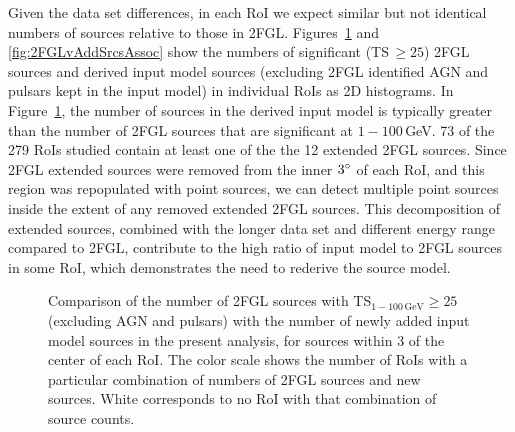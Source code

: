 {Given the data set differences, in each RoI we expect similar but not identical numbers of sources relative to those in 2FGL.
Figures~\ref{fig:2FGLvAddSrcs} and \ref{fig:2FGLvAddSrcsAssoc} show the numbers of significant (TS\,$\geq 25$) 2FGL sources and derived input model sources (excluding 2FGL identified AGN and pulsars kept in the input model) in individual RoIs as 2D histograms. In Figure~\ref{fig:2FGLvAddSrcs}, 
the number of sources in the derived input model is typically greater than the number of 2FGL sources that are significant at $1-100$\,GeV. 73 of the 279 RoIs studied contain at least one of the the 12 extended 2FGL sources. Since 2FGL extended sources were removed from the inner $3\mbox{$^\circ$}$ of each RoI, and this region was repopulated with point sources, we can detect multiple point sources inside the extent of any removed extended 2FGL sources. This decomposition of extended sources, combined with the longer data set and different energy range compared to 2FGL, contribute to the high ratio of input model to 2FGL sources in some RoI, which demonstrates the need to rederive the source model. %

\begin{figure}[h!]
	\centering
	\caption{Comparison of the number of 2FGL sources with TS$_{1-100\,\mathrm{GeV}} \geq 25$ (excluding AGN and pulsars) with the number of newly added input model sources in the present analysis, for sources within $3$\degr{} of the center of each RoI. The color scale shows the number of RoIs with a particular combination of numbers of 2FGL sources and new sources.
		White corresponds to no RoI with that combination of source counts.}
	\label{fig:2FGLvAddSrcs} 
\end{figure}

}

